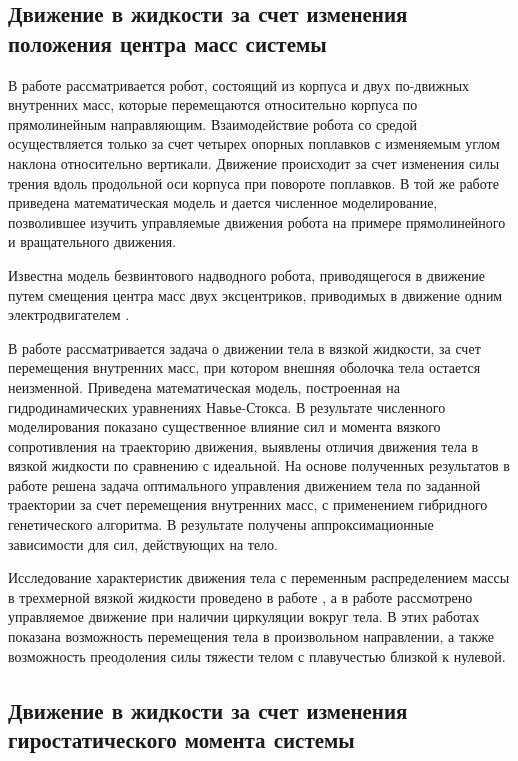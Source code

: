 \subsection{Движение в жидкости за счет изменения положения центра масс системы}\label{subsec:ch1/sec5/sub1}

В работе \cite{Volkova_Jatsun} рассматривается робот, состоящий из корпуса и двух по-движных внутренних масс, которые перемещаются относительно корпуса по прямолинейным направляющим. Взаимодействие робота со средой осуществляется только за счет четырех опорных поплавков с изменяемым углом наклона относительно вертикали. Движение происходит за счет изменения силы трения вдоль продольной оси корпуса при повороте поплавков. В той же работе приведена математическая модель и дается численное моделирование, позволившее изучить управляемые движения робота на примере прямолинейного и вращательного движения.

Известна модель безвинтового надводного робота, приводящегося в движение путем смещения центра масс двух эксцентриков, приводимых в движение одним электродвигателем \cite{patent_BNR}.

В работе \cite{Ramodanov_Tenenev} рассматривается задача о движении тела в вязкой жидкости, за счет перемещения внутренних масс, при котором внешняя оболочка тела остается неизменной. Приведена математическая модель, построенная на гидродинамических уравнениях Навье-Стокса. В результате численного моделирования показано существенное влияние сил и момента вязкого сопротивления на траекторию движения, выявлены отличия движения тела в вязкой жидкости по сравнению с идеальной. На основе полученных результатов в работе \cite{Vetchanin_Tenenev_2011} решена задача оптимального управления движением тела по заданной траектории за счет перемещения внутренних масс, с применением гибридного генетического алгоритма. В результате получены аппроксимационные зависимости для сил, действующих на тело.

Исследование характеристик движения тела с переменным распределением массы в трехмерной вязкой жидкости проведено в работе \cite{Vetchanin_Mamaev_Tenenev_ND_2012}, а в работе \cite{Kilin_Vetchanin_DAN_2016} рассмотрено управляемое движение при наличии циркуляции вокруг тела. В этих работах показана возможность перемещения тела в произвольном направлении, а также возможность преодоления силы тяжести телом с плавучестью близкой к нулевой.

\subsection{Движение в жидкости за счет изменения гиростатического момента системы}\label{subsec:ch1/sec5/sub2}



